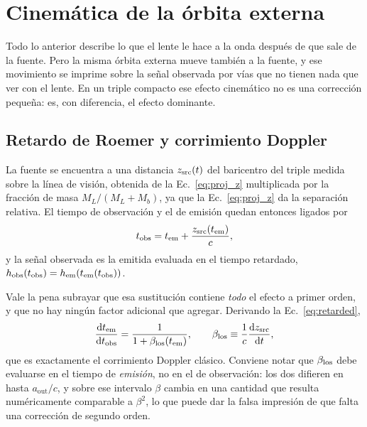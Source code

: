 \documentclass[11pt,a4paper,openany]{book}
\newcommand{\aout}{a_{\mathrm{out}}}
\begin{document}
\section{Cinem\'atica de la \'orbita externa}
\label{sec:kinematics}

Todo lo anterior describe lo que el lente le hace a la onda despu\'es de que
sale de la fuente. Pero la misma \'orbita externa mueve tambi\'en a la fuente,
y ese movimiento se imprime sobre la se\~nal observada por v\'ias que no
tienen nada que ver con el lente. En un triple compacto ese efecto cinem\'atico
no es una correcci\'on peque\~na: es, con diferencia, el efecto dominante.

\subsection*{Retardo de Roemer y corrimiento Doppler}

La fuente se encuentra a una distancia $z_{\rm src}(t)$ del baricentro del
triple medida sobre la l\'inea de visi\'on, obtenida de la
Ec.~\eqref{eq:proj_z} multiplicada por la fracci\'on de masa
$M_L/(M_L+M_b)$, ya que la Ec.~\eqref{eq:proj_z} da la separaci\'on relativa.
El tiempo de observaci\'on y el de emisi\'on quedan entonces ligados por
\begin{equation}
  t_{\rm obs}=t_{\rm em}+\frac{z_{\rm src}(t_{\rm em})}{c} ,
  \label{eq:retarded}
\end{equation}
y la se\~nal observada es la emitida evaluada en el tiempo retardado,
$h_{\rm obs}(t_{\rm obs})=h_{\rm em}(t_{\rm em}(t_{\rm obs}))$.

Vale la pena subrayar que esa sustituci\'on contiene \emph{todo} el efecto a
primer orden, y que no hay ning\'un factor adicional que agregar. Derivando la
Ec.~\eqref{eq:retarded},
\begin{equation}
  \dv{t_{\rm em}}{t_{\rm obs}}=\frac{1}{1+\beta_{\rm los}(t_{\rm em})},
  \qquad
  \beta_{\rm los}\equiv\frac{1}{c}\dv{z_{\rm src}}{t} ,
  \label{eq:classical_doppler}
\end{equation}
que es exactamente el corrimiento Doppler cl\'asico. Conviene notar que
$\beta_{\rm los}$ debe evaluarse en el tiempo de \emph{emisi\'on}, no en el de
observaci\'on: los dos difieren en hasta $\aout/c$, y sobre ese intervalo
$\beta$ cambia en una cantidad que resulta num\'ericamente comparable a
$\beta^{2}$, lo que puede dar la falsa impresi\'on de que falta una
correcci\'on de segundo orden.
\end{document}
